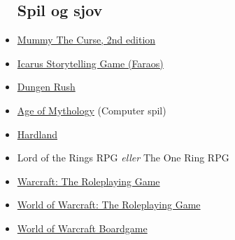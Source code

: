 \begin{itemize}
    \subsection{Spil og sjov}
    \item \href{https://www.kickstarter.com/projects/339646881/mummy-the-curse-2nd-edition}{Mummy The Curse, 2nd edition}
    \item \href{https://www.faraos.dk/games/braetspil/g-h-i/i/i/icarus-a-storytelling-game-about-how-great-civilizations-fall}{Icarus Storytelling Game (Faraos)}
    \item \href{https://boardgamegeek.com/boardgame/207338/dungeon-rush}{Dungen Rush}
    \item \href{https://store.steampowered.com/app/266840/Age_of_Mythology_Extended_Edition/}{Age of Mythology} (Computer spil)
    \item \href{https://store.steampowered.com/app/321980/Hardland/}{Hardland}
    \item Lord of the Rings RPG \textit{eller} The One Ring RPG
    \item \href{https://www.amazon.com/Warcraft-Roleplaying-Game-Arthaus/dp/1588460711}{Warcraft: The Roleplaying Game}
    \item \href{https://www.amazon.co.uk/World-Warcraft-Roleplaying-Game/dp/1588467813?SubscriptionId=AKIAILSHYYTFIVPWUY6Q&tag=duckduckgo-ffab-uk-21&linkCode=xm2&camp=2025&creative=165953&creativeASIN=1588467813}{World of Warcraft: The Roleplaying Game}
    \item \href{https://boardgamegeek.com/boardgame/17223/world-warcraft-boardgame}{World of Warcraft Boardgame}
\end{itemize}